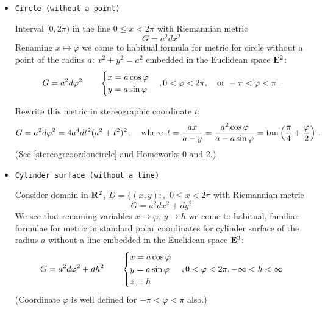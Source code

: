 \documentclass[12pt]{article}
\theoremstyle{theorem}
\numberwithin{equation}{section}
\begin{document}
\begin{itemize}
    \item   {\tt Circle (without a point)}

     Interval $[0,2\pi)$ in the line $0\leq x< 2\pi$ with Riemannian  metric
           \begin{equation}\label{circle1}
          G=  a^2dx^2
           \end{equation}
Renaming $x\mapsto \varphi $ we come to habitual formula for
metric
for circle without a point of the radius $a$: $x^2+y^2=a^2$ embedded in
the Euclidean space ${\bf E}^2$:
           \begin{equation}\label{circle2}
          G= a^2d\varphi^2\qquad
          \begin{cases}
          x=a\cos\varphi\cr
          y=a\sin\varphi
          \end {cases},
          0< \varphi <2\pi,
\quad {\rm or}\,\, -\pi<\varphi<\pi\,.
           \end{equation}


  {\footnotesize Rewrite this metric in stereographic coordinate
   $t$:
                \begin{equation}\label{circlestereograph} 
             G=a^2d\varphi^2=4a^4dt^2(a^2+t^2)^2\,,
\quad {\rm where}\,\,\,
       t={ax\over a-y}=
      {a^2\cos\varphi\over a-a\sin\varphi}=
\tan\left({\pi\over 4}+{\varphi\over 2}\right)\,.
                  \end{equation}
  (See \eqref{stereogrcoordoncircle} and Homeworks 0 and 2.)
}


   \item {\tt Cylinder surface (without a line)}

    Consider domain in ${\bf R}^2$,
 $D=\{(x,y)\colon,\,\, 0\leq x< 2\pi$ with Riemannian  metric
           \begin{equation}\label{domainascylinder1}
          G=  a^2dx^2+dy^2
           \end{equation}
We see that renaming variables $x\mapsto \varphi $, $y\mapsto h$ we come to habitual, familiar formulae for
metric in standard polar coordinates
for cylinder surface of the radius $a$ without a line
embedded in the Euclidean space ${\bf E}^3$:
           \begin{equation}\label{domainascylinder2}
          G= a^2d\varphi^2+dh^2\qquad
          \begin{cases}
          x=a\cos\varphi\cr
          y=a\sin\varphi\cr
          z=h\cr
          \end {cases},
          0< \varphi <2\pi, -\infty<h<\infty
           \end{equation}
(Coordinate  $\varphi$ is well defined for $-\pi<\varphi<\pi$
also.)



\end{itemize}
\end{document}
